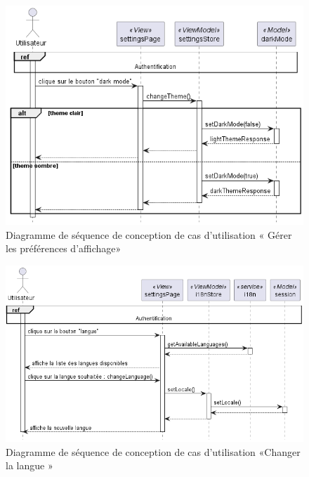 \begin{figure}[H]
  \centering
  \includegraphics[width=1\textwidth]{out/diagrams/sprint6/sequence_preferance_affichage/sequence_preferance_affichage}
  \caption{Diagramme de séquence de conception de cas d'utilisation « Gérer les préférences d'affichage»}
  \label{fig:conception_sequence_preferance_affichage}
\end{figure}

\begin{figure}[H]
  \centering
  \includegraphics[width=1\textwidth]{out/diagrams/sprint6/sequence_change_language/sequence_change_language}
  \caption{Diagramme de séquence de conception de cas d'utilisation «Changer la langue »}
  \label{fig:conception_sequence_change_language}
\end{figure}

